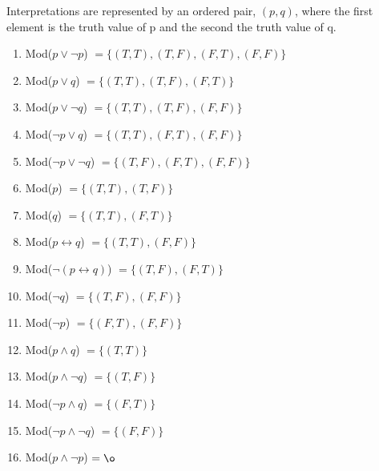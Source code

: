 Interpretations are represented by an ordered pair, $(p,q)$, where the first element is the truth value of p and the second the truth value of q.
\begin{enumerate}
    \item Mod($p \vee \neg p$) $= \{(T,T), (T,F), (F,T), (F,F)\}$

    \item Mod($p \vee q$) $= \{(T,T), (T,F), (F,T)\}$

    \item Mod($p \vee \neg q$) $= \{(T,T), (T,F), (F,F)\}$

    \item Mod($\neg p \vee q$) $= \{(T,T), (F,T), (F,F)\}$

    \item Mod($\neg p \vee \neg q$) $= \{(T,F), (F,T), (F,F)\}$

    \item Mod($p$) $= \{(T,T), (T,F)\}$

    \item Mod($q$) $= \{(T,T), (F,T)\}$

    \item Mod($p \leftrightarrow q$) $= \{(T,T), (F,F)\}$

    \item Mod($\neg (p \leftrightarrow q)$) $= \{(T,F), (F,T)\}$
    
    \item Mod($\neg q$) $= \{(T,F), (F,F)\}$

    \item Mod($\neg p$) $= \{(F,T), (F,F)\}$

    \item Mod($p \wedge q$) $= \{(T,T)\}$

    \item Mod($p \wedge \neg q$) $= \{(T,F)\}$

    \item Mod($\neg p \wedge q$) $= \{(F,T)\}$

    \item Mod($\neg p \wedge \neg q$) $= \{(F,F)\}$

    \item Mod($p \wedge \neg p$) $= \o$
\end{enumerate}